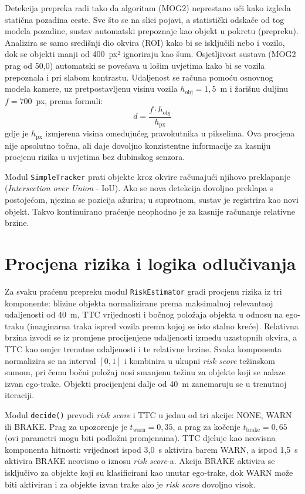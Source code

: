 Detekcija prepreka radi tako da algoritam (MOG2) neprestano uči kako izgleda statična pozadina ceste. Sve što se na slici pojavi, a statistički odskače od tog modela pozadine, sustav automatski prepoznaje kao objekt u pokretu (prepreku). Analizira se samo središnji dio okvira (ROI) kako bi se isključili nebo i vozilo, dok se objekti manji od 400~px² ignoriraju kao šum. Osjetljivost sustava (MOG2 prag od 50{,}0) automatski se povećava u lošim uvjetima kako bi se vozila prepoznala i pri slabom kontrastu. Udaljenost se računa pomoću osnovnog modela kamere, uz pretpostavljenu visinu vozila $h_{\text{obj}} = 1{,}5$~m i žarišnu duljinu $f = 700$~px, prema formuli:
\begin{equation}
    d = \frac{f \cdot h_{\text{obj}}}{h_{\text{px}}}
\end{equation}
gdje je $h_{\text{px}}$ izmjerena visina omeđujućeg pravokutnika u pikselima. Ova procjena nije apsolutno točna, ali daje dovoljno konzistentne informacije za kasniju procjenu rizika u uvjetima bez dubinskog senzora.

Modul \texttt{SimpleTracker} prati objekte kroz okvire računajući njihovo preklapanje (\textit{Intersection over Union} - IoU). Ako se nova detekcija dovoljno preklapa s postojećom, njezina se pozicija ažurira; u suprotnom, sustav je registrira kao novi objekt. Takvo kontinuirano praćenje neophodno je za kasnije računanje relativne brzine.


\section{Procjena rizika i logika odlučivanja}

Za svaku praćenu prepreku modul \texttt{RiskEstimator} gradi procjenu rizika iz tri komponente: blizine objekta normalizirane prema maksimalnoj relevantnoj udaljenosti od 40~m, TTC vrijednosti i bočnog položaja objekta u odnosu na ego-traku (imaginarna traka ispred vozila prema kojoj se isto stalno kreće). Relativna brzina izvodi se iz promjene procijenjene udaljenosti između uzastopnih okvira, a TTC kao omjer trenutne udaljenosti i te relativne brzine. Svaka komponenta normalizira se na interval $[0, 1]$ i kombinira u ukupni \textit{risk score} težinskom sumom, pri čemu bočni položaj nosi smanjenu težinu za objekte koji se nalaze izvan ego-trake. Objekti procijenjeni dalje od 40~m zanemaruju se u trenutnoj iteraciji.

Modul \texttt{decide()} prevodi \textit{risk score} i TTC u jednu od tri akcije: NONE, WARN ili BRAKE. Prag za upozorenje je $t_{\text{warn}} = 0{,}35$, a prag za kočenje $t_{\text{brake}} = 0{,}65$ (ovi parametri mogu biti podložni promjenama). TTC djeluje kao neovisna komponenta hitnosti: vrijednost ispod 3{,}0~s aktivira barem WARN, a ispod 1{,}5~s aktivira BRAKE neovisno o iznosu \textit{risk score}-a. Akcija BRAKE aktivira se isključivo za objekte koji su klasificirani kao unutar ego-trake, dok WARN može biti aktiviran i za objekte izvan trake ako je \textit{risk score} dovoljno visok.

